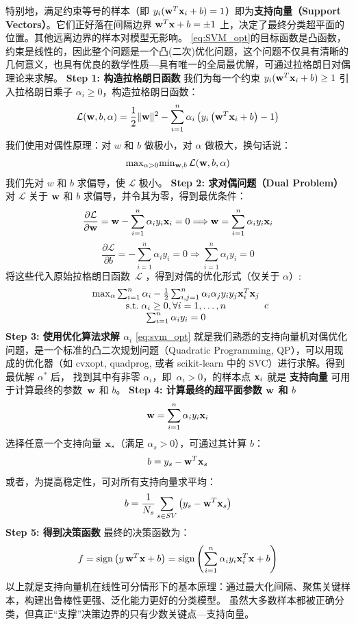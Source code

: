 特别地，满足约束等号的样本（即 $y_i({\bf w}^T {\bf x}_i + b) = 1$）即为\textbf{支持向量（Support Vectors）}。它们正好落在间隔边界 ${\bf w}^T {\bf x} + b= \pm 1$ 上，决定了最终分类超平面的位置。其他远离边界的样本对模型无影响。
\eqref{eq:SVM_opt}的目标函数是凸函数，约束是线性的，因此整个问题是一个凸(二次)优化问题，这个问题不仅具有清晰的几何意义，也具有优良的数学性质---具有唯一的全局最优解，可通过拉格朗日对偶理论来求解。
\textbf{Step 1: 构造拉格朗日函数}
我们为每一个约束 $y_i({\bf w}^T  {\bf x}_i + b ) \geq 1$ 引入拉格朗日乘子 $\alpha_i \geq 0$，构造拉格朗日函数：
$$
\mathcal{L}({\bf w}, b,\alpha) =  \frac{1}{2} \|{\bf w}\|^2 -\sum_{i=1}^n \alpha_i \left(  y_i \left( {\bf w}^T {\bf x}_i +b\right)-1\right)
$$
我们使用对偶性原理：对 $w$ 和 $b$ 做极小，对 $\alpha$ 做极大，换句话说：
$$
{\rm max}_{\alpha >0} {\rm min}_{{\bf w}, b}\, \mathcal{L}({\bf w}, b, \alpha)
$$
我们先对 $w$ 和 $b$ 求偏导，使 $\mathcal{L}$ 极小。
\textbf{Step 2: 求对偶问题（Dual Problem）}
对 $\mathcal{L}$ 关于 ${\bf w}$ 和 $b$ 求偏导，并令其为零，得到最优条件：
$$
\frac{\partial\mathcal{L}}{\partial {\bf w}}= {\bf w}- \sum_{i=1}^n \alpha_i y_i {\bf x}_i
= 0 \Longrightarrow {\bf w}= \sum_{i=1}^n \alpha_i y_i {\bf x}_i
$$
$$
\frac{\partial\mathcal{L}}{\partial b}=- \sum_{i=1}^n \alpha_i y_i  = 0 \Longrightarrow  \sum_{i=1}^n \alpha_i y_i =0
$$
将这些代入原始拉格朗日函数~$\mathcal{L}$ ，得到对偶的优化形式（仅关于 $\alpha$）:
\begin{equation}\label{eq:svm_opt}
\begin{array}{c}
{\rm max}_{\alpha} \sum_{i=1}^n \alpha_i -\frac{1}{2} \sum_{i,j=1}^n \alpha_i \alpha_j y_i y_j {\bf x}_i^T {\bf x}_j \\
{\rm s.t.} \; \alpha_i \ge 0, \forall i=1, \dots, n \\
  \sum_{i=1}^n \alpha_i y_i =0
  \end{array}{c}
\end{equation}
\textbf{Step 3: 使用优化算法求解 $\alpha_i$}
\eqref{eq:svm_opt} 就是我们熟悉的支持向量机对偶优化问题，是一个标准的凸二次规划问题（Quadratic Programming, QP），可以用现成的优化器（如 cvxopt, quadprog, 或者 scikit-learn 中的 SVC）进行求解。得到最优解 $\alpha^\ast$ 后， 找到其中有非零 $\alpha_i$，即~$\alpha_i>0$，的样本点 ${\bf x}_i$ 就是 \textbf{支持向量}
可用于计算最终的参数~${\bf w}$ 和 $b$。
\textbf{Step 4: 计算最终的超平面参数 ${\bf w}$ 和 $b$}
$$
{\bf w}= \sum_{i=1}^n \alpha_i y_i {\bf x}_i
$$
选择任意一个支持向量 ${\bf x}_s$（满足 $\alpha_s > 0$），可通过其计算 $b$：
$$
b= y_s -{\bf w}^T {\bf x}_s
$$
或者，为提高稳定性，可对所有支持向量求平均：
$$
b= \frac{1}{N_s} \sum_{s\in SV} \left( y_s - {\bf w}^T {\bf x}_s\right)
$$
\textbf{Step 5: 得到决策函数}
最终的决策函数为：
$$
f= {\rm sign}\left( y\, {\bf w}^T {\bf x} +b\right)= {\rm sign}\left(\sum_{i=1}^n \alpha_i y_i {\bf x}_i^T {\bf x} +b\right)
$$
以上就是支持向量机在线性可分情形下的基本原理：通过最大化间隔、聚焦关键样本，构建出鲁棒性更强、泛化能力更好的分类模型。
虽然大多数样本都被正确分类，但真正“支撑”决策边界的只有少数关键点---支持向量。

